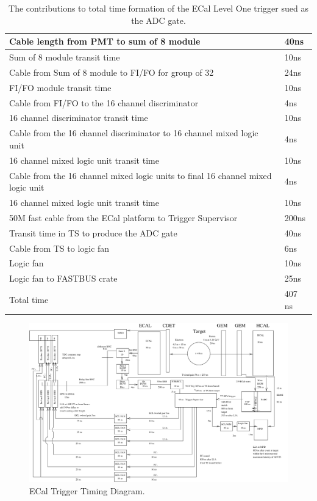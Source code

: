 \documentclass{article}
\begin{document}
\begin{table}
	\begin{tabular}{|l|l|} \hline
		Cable length from PMT to sum of 8 module & 40ns \\ \hline
		Sum of 8 module transit time & 10ns \\ \hline
		Cable from Sum of 8 module to FI/FO for group of 32 & 24ns \\ \hline
		FI/FO module transit time & 10ns \\ \hline
		Cable from FI/FO to the 16 channel discriminator & 4ns \\ \hline
		16 channel discriminator  transit time & 10ns \\ \hline
		Cable from the 16 channel discriminator to 16 channel mixed logic unit& 4ns \\ \hline
		16 channel mixed logic unit  transit time & 10ns \\ \hline
		Cable from the 16 channel mixed logic units to final 16 channel mixed logic unit& 4ns \\ \hline
		16 channel mixed logic unit  transit time & 10ns \\ \hline
		50M fast cable from the ECal platform to Trigger Supervisor & 200ns \\ \hline
		Transit time in TS to produce the ADC gate & 40ns \\ \hline
		Cable from TS to logic fan  & 6ns \\ \hline\hline
		Logic fan  & 10ns \\ \hline\hline
		Logic fan to FASTBUS crate & 25ns \\ \hline\hline
		Total time & 407 ns \\ \hline  		   		  		 		 
	\end{tabular}
	\caption{The contributions to total time formation of the ECal Level One trigger sued as the ADC gate.}
	\label{tab:ECALTrigtime}
\end{table}


\begin{figure}
		\centering
	 \includegraphics[scale=0.8,angle=90]{figs/GeP.pdf}
 	\caption{ECal Trigger Timing Diagram.  }
 	\label{fig:ECALTrigDiag}
 	\end{figure}
 	
\end{document}
